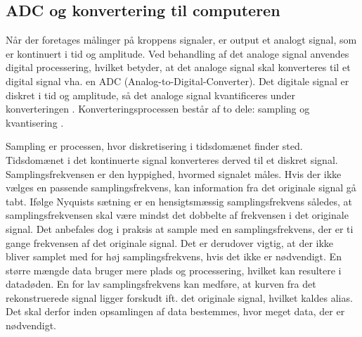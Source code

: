 \subsection{ADC og konvertering til computeren}\label{ADCafsnit}
Når der foretages målinger på kroppens signaler, er output et analogt signal, som er kontinuert i tid og amplitude. Ved behandling af det analoge signal anvendes digital processering, hvilket betyder, at det analoge signal skal konverteres til et digital signal vha. en ADC (Analog-to-Digital-Converter). Det digitale signal er diskret i tid og amplitude, så det analoge signal kvantificeres under konverteringen \cite{webster2009}. Konverteringsprocessen består af to dele: sampling og kvantisering \cite{Zouridakis2003}.  

Sampling er processen, hvor diskretisering i tidsdomænet finder sted. Tidsdomænet i det kontinuerte signal konverteres derved til et diskret signal. Samplingsfrekvensen er den hyppighed, hvormed signalet måles. Hvis der ikke vælges en passende samplingsfrekvens, kan information fra det originale signal gå tabt. Ifølge Nyquists sætning er en hensigtsmæssig samplingsfrekvens således, at samplingsfrekvensen skal være mindst det dobbelte af frekvensen i det originale signal. \cite{Zouridakis2003} Det anbefales dog i praksis at sample med en samplingsfrekvens, der er ti gange frekvensen af det originale signal. Det er derudover vigtig, at der ikke bliver samplet med for høj samplingsfrekvens, hvis det ikke er nødvendigt. En større mængde data bruger mere plads og processering, hvilket kan resultere i datadøden. \cite{Aminoff2012,Wolf2004} En for lav samplingsfrekvens kan medføre, at kurven fra det rekonstruerede signal ligger forskudt ift. det originale signal, hvilket kaldes alias. \cite{Zouridakis2003} Det skal derfor inden opsamlingen af data bestemmes, hvor meget data, der er nødvendigt.

